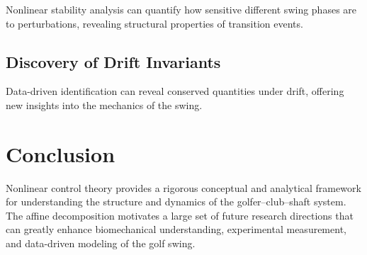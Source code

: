 \documentclass[12pt]{article}
\begin{document}
Nonlinear stability analysis can quantify how sensitive different swing phases are to perturbations, revealing structural properties of transition events.

\subsection{Discovery of Drift Invariants}

Data-driven identification can reveal conserved quantities under drift, offering new insights into the mechanics of the swing.

\section{Conclusion}

Nonlinear control theory provides a rigorous conceptual and analytical framework for understanding the structure and dynamics of the golfer--club--shaft system. The affine decomposition motivates a large set of future research directions that can greatly enhance biomechanical understanding, experimental measurement, and data-driven modeling of the golf swing.
\end{document}
